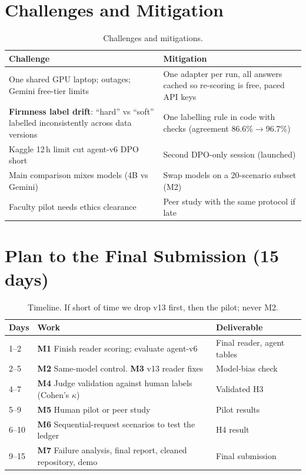 \documentclass[11pt,a4paper]{article}
\begin{document}
\section{Challenges and Mitigation}
\begin{table}[H]
\centering\small
\begin{tabularx}{\textwidth}{@{}L{5.6cm} Y@{}}
\toprule
\textbf{Challenge} & \textbf{Mitigation}\\
\midrule
One shared GPU laptop; outages; Gemini free-tier limits & One adapter per run, all answers cached so re-scoring is free, paced API keys\\
\textbf{Firmness label drift}: ``hard'' vs ``soft'' labelled inconsistently across data versions & One labelling rule in code with checks (agreement 86.6\%$\to$96.7\%)\\
Kaggle 12\,h limit cut agent-v6 DPO short & Second DPO-only session (launched)\\
Main comparison mixes models (4B vs Gemini) & Swap models on a 20-scenario subset (M2)\\
Faculty pilot needs ethics clearance & Peer study with the same protocol if late\\
\bottomrule
\end{tabularx}
\caption{Challenges and mitigations.}
\end{table}

\section{Plan to the Final Submission (15 days)}
\begin{table}[H]
\centering\small
\begin{tabularx}{\textwidth}{@{}L{1.4cm} Y L{3.6cm}@{}}
\toprule
\textbf{Days} & \textbf{Work} & \textbf{Deliverable}\\
--2 & \textbf{M1} Finish reader scoring; evaluate agent-v6 & Final reader, agent tables\\
2--5 & \textbf{M2} Same-model control. \textbf{M3} v13 reader fixes & Model-bias check\\
4--7 & \textbf{M4} Judge validation against human labels (Cohen's $\kappa$) & Validated H3\\
5--9 & \textbf{M5} Human pilot or peer study & Pilot results\\
6--10 & \textbf{M6} Sequential-request scenarios to test the ledger & H4 result\\
9--15 & \textbf{M7} Failure analysis, final report, cleaned repository, demo & Final submission\\
\bottomrule
\end{tabularx}
\caption{Timeline. If short of time we drop v13 first, then the pilot; never M2.}
\end{table}
\end{document}
